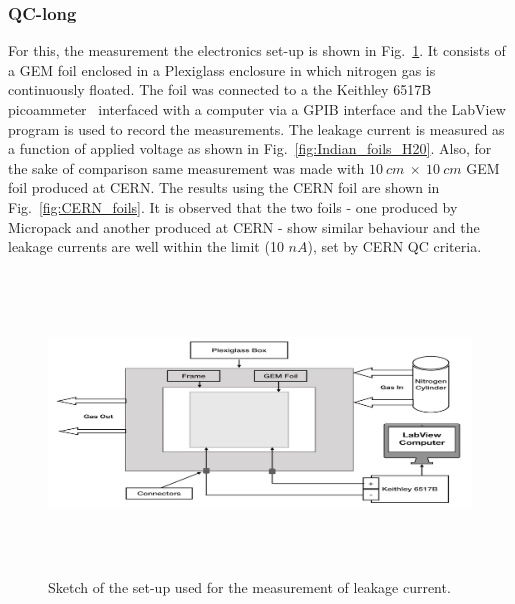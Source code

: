 \subsubsection{QC-long} %
\label{ssub:qc_long}
For this, the measurement the electronics set-up is shown in Fig.~\ref{fig:Cleaning_Measurement}.
It consists of a GEM foil enclosed in a Plexiglass enclosure in which nitrogen gas is continuously floated.
The foil was connected to a the Keithley 6517B picoammeter~\cite{Keithley-6517B-picoammeter} interfaced with a computer via a GPIB interface and the LabView program is used to record the measurements.
The leakage current is measured as a function of applied voltage as shown in Fig.~\ref{fig:Indian_foils_H20}.
Also, for the sake of comparison same measurement was made with $10~cm~\times~10~cm$ GEM foil produced at CERN.
The results using the CERN foil are shown in Fig.~\ref{fig:CERN_foils}.
It is observed that the two foils - one produced by Micropack and another produced at CERN - show similar behaviour and the leakage currents are well within the limit (10 $nA$), set by CERN QC criteria.
\begin{figure}[!htbp]
    \centering
        \includegraphics[width=12cm,height=8cm]{figures/GEM/figures/10.jpeg}
   \caption{Sketch of the set-up used for the measurement of leakage current.} \label{fig:Cleaning_Measurement}
\end{figure}
